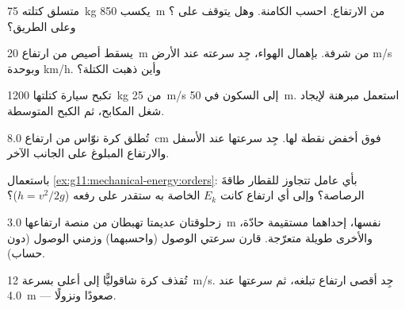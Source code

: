 \begin{exercise}[$\star$]\label{exo:g11:mechanical-energy:2}
متسلق كتلته \qty{75}{kg} يكسب \qty{850}{m} من الارتفاع. احسب 
 الكامنة. وهل يتوقف على ؟ وعلى الطريق؟
\end{exercise}

\begin{exercise}[$\star$]\label{exo:g11:mechanical-energy:3}
يسقط أصيص من ارتفاع \qty{20}{m} من شرفة. بإهمال  الهواء،
جِد سرعته عند الأرض  \unit{m/s} وبوحدة \unit{km/h}. وأين ذهبت الكتلة؟
\end{exercise}

\begin{exercise}[$\star$]\label{exo:g11:mechanical-energy:4}
تكبح سيارة كتلتها \qty{1200}{kg} من \qty{25}{m/s} إلى السكون في \qty{50}{m}.
استعمل مبرهنة  لإيجاد شغل المكابح، ثم
 الكبح المتوسطة.
\end{exercise}

\begin{exercise}[$\star$]\label{exo:g11:mechanical-energy:5}
تُطلق كرة نوّاس من ارتفاع \qty{8.0}{cm} فوق أخفض نقطة لها. جِد
سرعتها عند الأسفل والارتفاع المبلوغ على الجانب الآخر.
\end{exercise}

\begin{exercise}[$\star\star$]\label{exo:g11:mechanical-energy:6}
باستعمال \cref{ex:g11:mechanical-energy:orders}: بأي عامل تتجاوز 
للقطار طاقةَ الرصاصة؟ وإلى أي ارتفاع كانت $E_k$ الخاصة به
ستقدر على رفعه ($h = v^2/2g$)؟
\end{exercise}

\begin{exercise}[$\star\star$]\label{exo:g11:mechanical-energy:7}
زحلوقتان عديمتا  تهبطان من منصة ارتفاعها \qty{3.0}{m} نفسها، إحداهما
مستقيمة حادّة، والأخرى طويلة متعرّجة. قارن سرعتي الوصول
(واحسبهما) وزمني الوصول (دون حساب).
\end{exercise}

\begin{exercise}[$\star\star$]\label{exo:g11:mechanical-energy:8}
تُقذف كرة شاقوليًّا إلى أعلى بسرعة \qty{12}{m/s}. جِد أقصى ارتفاع
تبلغه، ثم سرعتها عند \qty{4.0}{m} --- صعودًا ونزولًا.
\end{exercise}

